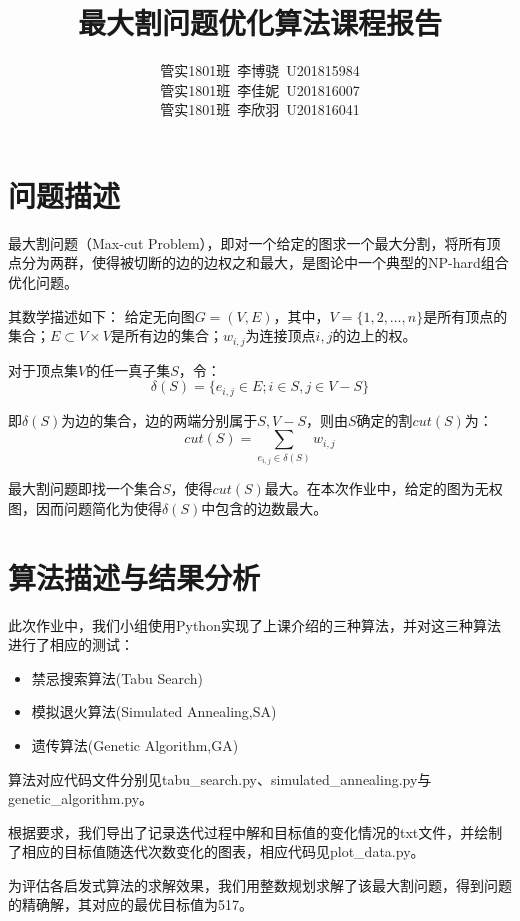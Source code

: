 \documentclass{article}
\title{最大割问题优化算法课程报告}
\author{管实1801班~李博骁~U201815984\\管实1801班~李佳妮~U201816007\\管实1801班~李欣羽~U201816041}
\begin{document}
    \maketitle
    \newpage
    \tableofcontents
    \newpage

    \section{问题描述}
    最大割问题（Max-cut Problem），即对一个给定的图求一个最大分割，将所有顶点分为两群，使得被切断的边的边权之和最大，是图论中一个典型的NP-hard组合优化问题。

    其数学描述如下：
    给定无向图$G=(V,E)$，其中，$V=\{1,2,\dots,n\}$是所有顶点的集合；$E\subset V \times V$是所有边的集合；$w_{i,j}$为连接顶点$i,j$的边上的权。

    对于顶点集$V$的任一真子集$S$，令：
    \begin{equation}
        \delta(S)=\{e_{i,j}\in E;i\in S,j\in V-S\}
    \end{equation}

    即$\delta(S)$为边的集合，边的两端分别属于$S,V-S$，则由$S$确定的割$cut(S)$为：
    \begin{equation}
        cut(S)=\sum_{e_{i,j}\in \delta(S)} w_{i,j}
    \end{equation}

    最大割问题即找一个集合$S$，使得$cut(S)$最大。在本次作业中，给定的图为无权图，因而问题简化为使得$\delta(S)$中包含的边数最大。

    \section{算法描述与结果分析}
    此次作业中，我们小组使用Python实现了上课介绍的三种算法，并对这三种算法进行了相应的测试：
    \begin{itemize}
        \item 禁忌搜索算法(Tabu Search)
        \item 模拟退火算法(Simulated Annealing,SA)
        \item 遗传算法(Genetic Algorithm,GA)
    \end{itemize}
    
    算法对应代码文件分别见tabu\_search.py、simulated\_annealing.py与genetic\_algorithm.py。

    根据要求，我们导出了记录迭代过程中解和目标值的变化情况的txt文件，并绘制了相应的目标值随迭代次数变化的图表，相应代码见plot\_data.py。

    为评估各启发式算法的求解效果，我们用整数规划求解了该最大割问题，得到问题的精确解，其对应的最优目标值为517。
\end{document}

